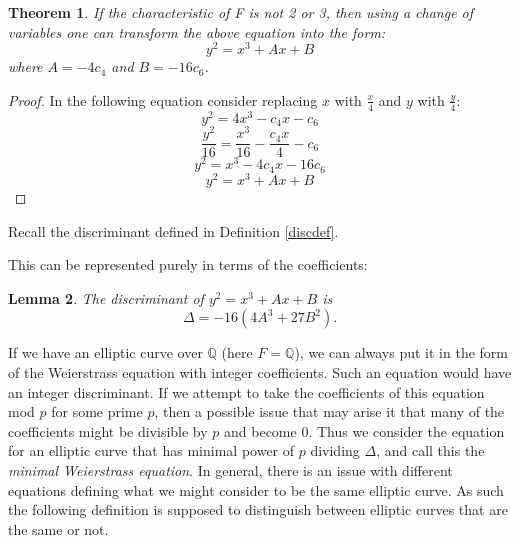 \documentclass{article}
\newtheorem{theorem}{Theorem}[section]
\newtheorem{lemma}[theorem]{Lemma}
\theoremstyle{definition}
\newtheorem{definition}{Definition}[section]
\theoremstyle{definition}
\theoremstyle{definition}
\newcommand{\Q}{\mathbb{Q}}
\begin{document}
\begin{theorem}If the characteristic of F is not 2 or 3, then
using a change of variables one can transform the above equation into the form: $$y^2=x^3+Ax+B$$ where $A=-4c_4$ and $B=-16c_6$.   
\end{theorem}
\begin{proof}
    In the following equation consider replacing $x$ with $\frac{x}{4}$ and $y$ with $\frac{y}{4}$:
    $$y^2=4x^3-c_4x-c_6$$
    $$\frac{y^2}{16}=\frac{x^3}{16}-\frac{c_4x}{4}-c_6$$
    $$y^2=x^3-4c_4x-16c_6$$
    $$y^2=x^3+Ax+B$$
\end{proof}

Recall the discriminant defined in Definition \ref{discdef}.

 This can be represented purely in terms of the coefficients:

\begin{lemma}
   The discriminant of $y^2=x^3+Ax+B$ is $$\Delta=-16(4A^3+27B^2).$$
\end{lemma}
 

If we have an elliptic curve over $\mathbb{Q}$ (here $F=\Q$), we can always put it in the form of the Weierstrass equation with integer coefficients. Such an equation would have an integer discriminant. If we attempt to take the coefficients of this equation mod $p$ for some prime $p$, then a possible issue that may arise it that many of the coefficients might be divisible by $p$ and become $0$. Thus we consider  the equation for an elliptic curve that has minimal power of $p$ dividing $\Delta$, and call this the \emph{minimal Weierstrass equation}.
\newline\newline
In general, there is an issue with different equations defining what we might consider to be the same elliptic curve. As such the following definition is supposed to distinguish between elliptic curves that are the same or not.


\end{document}
